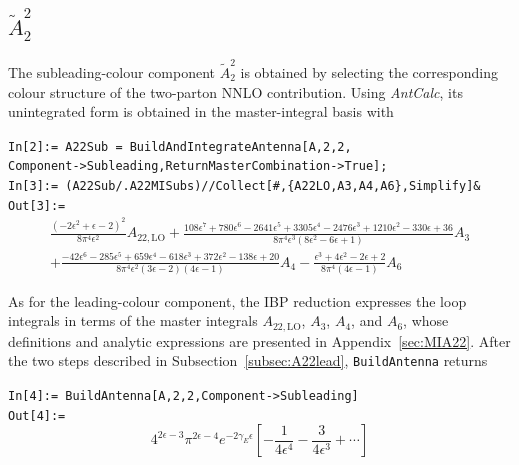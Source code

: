 \subsection{$\tilde A_2^2$}

The subleading-colour component $\tilde A_2^2$ is obtained by selecting the corresponding colour
structure of the two-parton NNLO contribution. Using \textit{AntCalc}, its unintegrated form is
obtained in the master-integral basis with

\begin{mdframed}[backgroundcolor=gray!10, linewidth=0pt]
\texttt{In[2]:= A22Sub = BuildAndIntegrateAntenna[A,2,2,\\Component->Subleading,ReturnMasterCombination->True];}\\
\texttt{In[3]:= (A22Sub/.A22MISubs)//Collect[\#,\{A22LO,A3,A4,A6\},Simplify]\&}\\
\hfill
\texttt{Out[3]:=}
    \begin{equation*}
        \begin{gathered}
            \frac{\left(-2\epsilon^2+\epsilon-2\right)^2}{8\pi^4\epsilon^2}A_{22,\text{LO}}
            +\frac{108\epsilon^7+780\epsilon^6-2641\epsilon^5+3305\epsilon^4-2476\epsilon^3+1210\epsilon^2-330\epsilon+36}{8\pi^4\epsilon^3\left(8\epsilon^2-6\epsilon+1\right)}A_3\\
            +\frac{-42\epsilon^6-285\epsilon^5+659\epsilon^4-618\epsilon^3+372\epsilon^2-138\epsilon+20}{8\pi^4\epsilon^2(3\epsilon-2)(4\epsilon-1)}A_4
            -\frac{\epsilon^3+4\epsilon^2-2\epsilon+2}{8\pi^4(4\epsilon-1)}A_6
        \end{gathered}
    \end{equation*}
\end{mdframed}

As for the leading-colour component, the IBP reduction expresses the loop integrals in terms of the
master integrals $A_{22,\mathrm{LO}}$, $A_3$, $A_4$, and $A_6$, whose definitions and analytic
expressions are presented in Appendix~\ref{sec:MIA22}. After the two steps described in
Subsection~\ref{subsec:A22lead}, \texttt{BuildAntenna} returns

\begin{mdframed}[backgroundcolor=gray!10, linewidth=0pt]
\texttt{In[4]:= BuildAntenna[A,2,2,Component->Subleading]}\\
\hfill
\texttt{Out[4]:=}
    \begin{equation*}
4^{2\epsilon-3}\pi^{2\epsilon-4}e^{-2\gamma_E\epsilon}\left[-\frac1{4\epsilon^4}-\frac3{4\epsilon^3}+\cdots\right]
    \end{equation*}
\end{mdframed}

